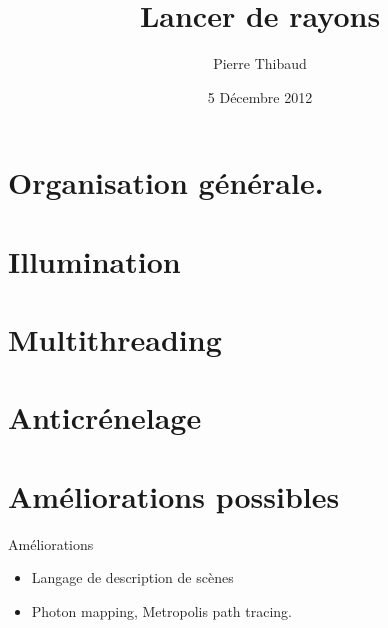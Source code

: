\documentclass[10pt,a4paper]{beamer}
\author{Pierre \bsc{Donat-Bouillud} Thibaud \bsc{Ehret}}
\title{Lancer de rayons}
\date{5 Décembre 2012}
\begin{document}
\frame{\titlepage}

\frame{\tableofcontents}

\section{Organisation générale.}


\frame{\tableofcontents}

\section{Illumination}


\frame{\tableofcontents}

\section{Multithreading} 


\frame{\tableofcontents}

\section{Anticrénelage}


\section{Améliorations possibles}

\begin{frame}{Améliorations}
\begin{itemize}
\item Langage de description de scènes
\item Photon mapping, Metropolis path tracing.
\end{itemize}
\end{frame}
\end{document}
